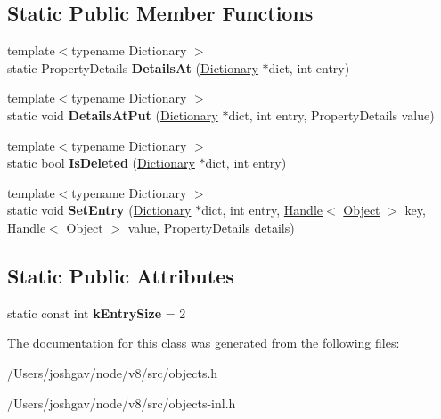 \subsection*{Static Public Member Functions}
\begin{DoxyCompactItemize}
\item 
{\footnotesize template$<$typename Dictionary $>$ }\\static Property\+Details {\bfseries Details\+At} (\hyperlink{classv8_1_1internal_1_1_dictionary}{Dictionary} $\ast$dict, int entry)\hypertarget{classv8_1_1internal_1_1_global_dictionary_shape_a9743108d4afc10eec3908e66e059a599}{}\label{classv8_1_1internal_1_1_global_dictionary_shape_a9743108d4afc10eec3908e66e059a599}

\item 
{\footnotesize template$<$typename Dictionary $>$ }\\static void {\bfseries Details\+At\+Put} (\hyperlink{classv8_1_1internal_1_1_dictionary}{Dictionary} $\ast$dict, int entry, Property\+Details value)\hypertarget{classv8_1_1internal_1_1_global_dictionary_shape_a9e5dbc147789061e3ef81ab89e52a505}{}\label{classv8_1_1internal_1_1_global_dictionary_shape_a9e5dbc147789061e3ef81ab89e52a505}

\item 
{\footnotesize template$<$typename Dictionary $>$ }\\static bool {\bfseries Is\+Deleted} (\hyperlink{classv8_1_1internal_1_1_dictionary}{Dictionary} $\ast$dict, int entry)\hypertarget{classv8_1_1internal_1_1_global_dictionary_shape_a3de81ec2781665e047bc5ec67c976185}{}\label{classv8_1_1internal_1_1_global_dictionary_shape_a3de81ec2781665e047bc5ec67c976185}

\item 
{\footnotesize template$<$typename Dictionary $>$ }\\static void {\bfseries Set\+Entry} (\hyperlink{classv8_1_1internal_1_1_dictionary}{Dictionary} $\ast$dict, int entry, \hyperlink{classv8_1_1internal_1_1_handle}{Handle}$<$ \hyperlink{classv8_1_1internal_1_1_object}{Object} $>$ key, \hyperlink{classv8_1_1internal_1_1_handle}{Handle}$<$ \hyperlink{classv8_1_1internal_1_1_object}{Object} $>$ value, Property\+Details details)\hypertarget{classv8_1_1internal_1_1_global_dictionary_shape_a8713fa1576a6618f10a1cdde04f098a9}{}\label{classv8_1_1internal_1_1_global_dictionary_shape_a8713fa1576a6618f10a1cdde04f098a9}

\end{DoxyCompactItemize}
\subsection*{Static Public Attributes}
\begin{DoxyCompactItemize}
\item 
static const int {\bfseries k\+Entry\+Size} = 2\hypertarget{classv8_1_1internal_1_1_global_dictionary_shape_a1106aeafb8612e48b391e6aeb1f051be}{}\label{classv8_1_1internal_1_1_global_dictionary_shape_a1106aeafb8612e48b391e6aeb1f051be}

\end{DoxyCompactItemize}


The documentation for this class was generated from the following files\+:\begin{DoxyCompactItemize}
\item 
/\+Users/joshgav/node/v8/src/objects.\+h\item 
/\+Users/joshgav/node/v8/src/objects-\/inl.\+h\end{DoxyCompactItemize}
